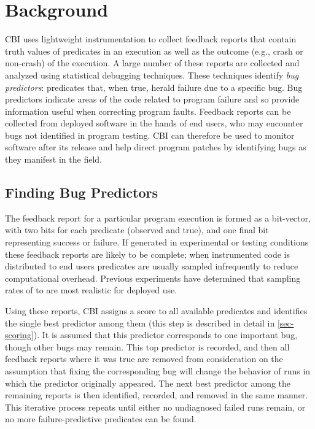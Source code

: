 
\section{Background}
\label{sec-background}
CBI uses lightweight instrumentation to collect feedback reports that contain truth values of predicates in an execution as well as the outcome (e.g., crash or non-crash) of the execution.  A large number of these reports are collected and analyzed using statistical debugging techniques.  These techniques identify \emph{bug predictors}: predicates that, when true, herald failure due to a specific bug.  Bug predictors indicate areas of the code related to program failure and so provide information useful when correcting program faults.  Feedback reports can be collected from deployed software in the hands of end users, who may encounter bugs not identified in program testing.  CBI can therefore be used to monitor software after its release and help direct program patches by identifying bugs as they manifest in the field.

\subsection{Finding Bug Predictors}
\label{sec-elimalg}
The feedback report for a particular program execution is formed as a bit-vector, with two bits for each predicate (observed and true), and one final bit representing success or failure.  If generated in experimental or testing conditions these feedback reports are likely to be complete; when instrumented code is distributed to end users predicates are usually sampled infrequently to reduce computational overhead.  Previous experiments \cite{Liblit:2003:BIRPS} have determined that sampling rates of  to  are most realistic for deployed use.

Using these reports, CBI assigns a score to all available predicates and identifies the single best predictor among them (this step is described in detail in \autoref{sec-scoring}).  It is assumed that this predictor corresponds to one important bug, though other bugs may remain.    This top predictor is recorded, and then all feedback reports where it was true are removed from consideration on the assumption that fixing the corresponding bug will change the behavior of runs in which the predictor originally appeared.  The next best predictor among the remaining reports is then identified, recorded, and removed in the same manner.  This iterative process repeats until either no undiagnosed failed runs remain, or no more failure-predictive predicates can be found.

